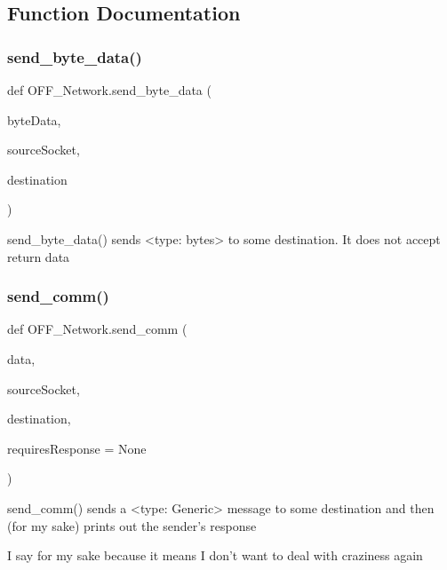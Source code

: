\subsection{Function Documentation}
\mbox{\label{namespace_o_f_f___network_a0ab8439ad8255392538b5966e5168506}} 
\subsubsection{\texorpdfstring{send\+\_\+byte\+\_\+data()}{send\_byte\_data()}}
{\footnotesize\ttfamily def O\+F\+F\+\_\+\+Network.\+send\+\_\+byte\+\_\+data (\begin{DoxyParamCaption}\item[{}]{byte\+Data,  }\item[{}]{source\+Socket,  }\item[{}]{destination }\end{DoxyParamCaption})}

\begin{DoxyVerb}send_byte_data() sends <type: bytes> to some destination. It does not
accept return data
\end{DoxyVerb}
 \mbox{\label{namespace_o_f_f___network_a07ee3bf5d20771b38ba37bc09a63988b}} 
\subsubsection{\texorpdfstring{send\+\_\+comm()}{send\_comm()}}
{\footnotesize\ttfamily def O\+F\+F\+\_\+\+Network.\+send\+\_\+comm (\begin{DoxyParamCaption}\item[{}]{data,  }\item[{}]{source\+Socket,  }\item[{}]{destination,  }\item[{}]{requires\+Response = {\ttfamily None} }\end{DoxyParamCaption})}

\begin{DoxyVerb}send_comm() sends a <type: Generic> message to some destination and then
(for my sake) prints out the sender's response

I say for my sake because it means I don't want to deal with craziness again
\end{DoxyVerb}
 \mbox{\label{namespace_o_f_f___network_ad4c88e602c445d2b5a4a32564decf49c}} 
